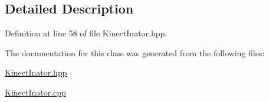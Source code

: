 \subsection{Detailed Description}


Definition at line 58 of file Kinect\-Inator.\-hpp.



The documentation for this class was generated from the following files\-:\begin{DoxyCompactItemize}
\item 
\hyperlink{_kinect_inator_8hpp}{Kinect\-Inator.\-hpp}\item 
\hyperlink{_kinect_inator_8cpp}{Kinect\-Inator.\-cpp}\end{DoxyCompactItemize}
